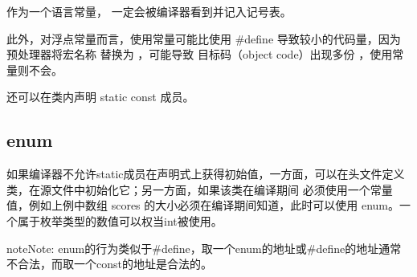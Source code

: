 \documentclass[letterpaper,10pt,english]{sphinxmanual}
\begin{document}
作为一个语言常量，  一定会被编译器看到并记入记号表。

此外，对浮点常量而言，使用常量可能比使用 \#define 导致较小的代码量，因为预处理器将宏名称  替换为   ，可能导致
目标码（object code）出现多份  ，使用常量则不会。

还可以在类内声明 static const 成员。

%
\begin{sphinxVerbatim}[commandchars=\\\{\},numbers=left,firstnumber=1,stepnumber=1]
 
        
   \PYG{p}{[}\PYG{p}{]} 
\end{sphinxVerbatim}


\subsection{enum}
\label{\detokenize{cpp/20_define:enum}}
如果编译器不允许static成员在声明式上获得初始值，一方面，可以在头文件定义类，在源文件中初始化它；另一方面，如果该类在编译期间
必须使用一个常量值，例如上例中数组 scores 的大小必须在编译期间知道，此时可以使用 enum。一个属于枚举类型的数值可以权当int被使用。

%
\begin{sphinxVerbatim}[commandchars=\\\{\},numbers=left,firstnumber=1,stepnumber=1]
 
      
   \PYG{p}{[}\PYG{p}{]} 
\end{sphinxVerbatim}

\begin{sphinxadmonition}{note}{Note:}
enum的行为类似于\#define，取一个enum的地址或\#define的地址通常不合法，而取一个const的地址是合法的。
\end{sphinxadmonition}
\end{document}
